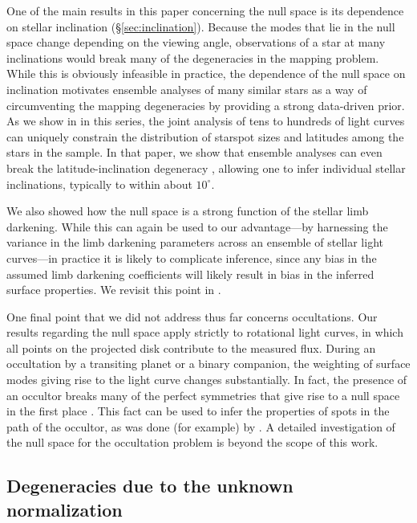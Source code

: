 \documentclass[modern,linenumbers]{aastex62}
\begin{document}
One of the main results in this paper concerning the null space is its
dependence on stellar inclination (\S\ref{sec:inclination}).
Because the modes that lie in the null
space change depending on the viewing angle, observations of a star at many
inclinations would break many of the degeneracies in the mapping problem. While
this is obviously infeasible in practice, the dependence of the null
space on inclination motivates ensemble analyses of many similar stars
as a way of circumventing the mapping degeneracies by
providing a strong data-driven prior. As we show in
 in this series, the joint analysis of tens to hundreds
of light curves can uniquely constrain the distribution of starspot
sizes and latitudes among the stars in the sample. In that paper,
we show that ensemble analyses can
even break the latitude-inclination degeneracy \citep[e.g.,][]{Walkowicz2013},
allowing one to infer individual stellar inclinations, typically to within
about $10^\circ$.

We also showed how the null space is a strong function of the stellar limb
darkening. While this can again be used to our advantage---by harnessing the
variance in the limb darkening parameters across an ensemble of stellar
light curves---in practice it is likely to complicate inference, since
any bias in the assumed limb darkening coefficients will likely result in
bias in the inferred surface properties. We revisit this point in
.

One final point that we did not address thus far concerns occultations.
Our results regarding the null space apply strictly to rotational light curves,
in which all points on the projected disk contribute to the measured flux.
During an occultation by a transiting planet or a binary companion, the
weighting of surface modes giving rise to the light curve changes
substantially. In fact, the presence of an occultor breaks many of the perfect
symmetries that give rise to a null space in the first place
\citep[e.g.,][]{Luger2019}. This fact can be used to infer the properties
of spots in the path of the occultor, as was done (for example)
by \citet[e.g.,][]{Morris2017}. A detailed investigation of the null space
for the occultation problem is beyond the scope of this work.

\subsection{Degeneracies due to the unknown normalization}
\end{document}
